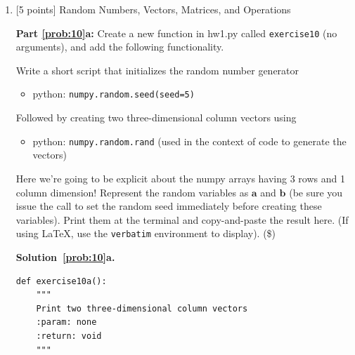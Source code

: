 \documentclass[10pt]{article}
\begin{document}
\begin{enumerate}
\begin{verbatim}
$ for i in $(seq 1 9); do echo -n "$i: " && ./hw1.py; done
1: Threw double-six 2.7%
2: Threw double-six 2.4%
3: Threw double-six 3.4%
4: Threw double-six 2.1%
5: Threw double-six 2.6%
6: Threw double-six 2.6%
7: Threw double-six 2.3%
8: Threw double-six 3.2%
9: Threw double-six 3.2%
\end{verbatim}

Putting back in {\tt seed=8}, I go back to the same result:

\begin{verbatim}
$ for i in $(seq 1 10); do echo -n "$i: " && ./hw1.py; done
1: Threw double-six 2.6%
2: Threw double-six 2.6%
3: Threw double-six 2.6%
4: Threw double-six 2.6%
5: Threw double-six 2.6%
6: Threw double-six 2.6%
7: Threw double-six 2.6%
8: Threw double-six 2.6%
9: Threw double-six 2.6%
10: Threw double-six 2.6%
\end{verbatim}

Being able to count on a "random" number allows one to write tests for such functions.

\item \label{prob:10} [5 points] Random Numbers, Vectors, Matrices, and Operations

{\bf Part \ref{prob:10}a:} Create a new function in hw1.py called {\tt exercise10} (no arguments), and add the following functionality.

Write a short script that initializes the random number generator
\begin{itemize}
\item[] python: {\tt numpy.random.seed(seed=5)}
\end{itemize}
Followed by creating two three-dimensional column vectors using
\begin{itemize}
\item[] python: {\tt numpy.random.rand} (used in the context of code to generate the vectors)
\end{itemize}
Here we're going to be explicit about the numpy arrays having 3 rows and 1 column dimension!
Represent the random variables as $\mathbf{a}$ and $\mathbf{b}$ (be sure you issue the call to set the random seed immediately before creating these variables).  Print them at the terminal and copy-and-paste the result here. (If using \LaTeX, use the {\tt verbatim} environment to display). (\$)

{\bf Solution~\ref{prob:10}a.} 

\begin{verbatim}
def exercise10a():
    """
    Print two three-dimensional column vectors
    :param: none
    :return: void
    """


\end{verbatim}
\end{enumerate}
\end{document}
